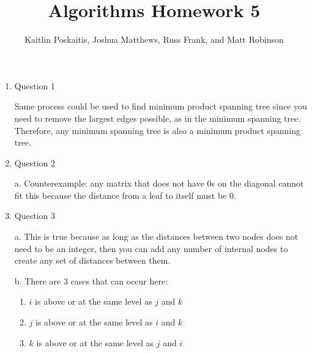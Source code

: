 \documentclass[12pt]{article}
\title{\bf Algorithms Homework 5}
\author{Kaitlin Poskaitis, Joshua Matthews, Russ Frank, and Matt Robinson}
\date{}
\begin{document}
\maketitle

\begin{enumerate}

\item Question 1

    Same process could be used to find minimum product spanning tree since you
    need to
    remove the largest edges possible, as in the minimum spanning tree.
    Therefore, any minimum spanning tree is also a minimum product spanning
    tree.

\item Question 2

    a. Counterexample: any matrix that does not have 0s on the diagonal cannot
    fit this because the distance from a leaf to itself must be 0.

\item Question 3

    a. This is true because as long as the distances between two nodes does not
    need to be an integer, then you can add any number of internal nodes to
    create any set of distances between them.

    b. There are 3 cases that can occur here:
    \begin{enumerate}
        \item $i$ is above or at the same level as $j$ and $k$
        \item $j$ is above or at the same level as $i$ and $k$
        \item $k$ is above or at the same level as $j$ and $i$
    \end{enumerate}

\end{enumerate}
\end{document}
